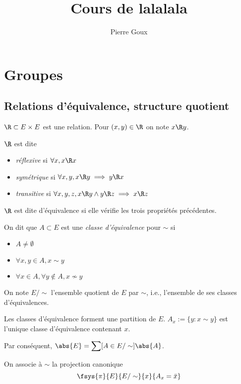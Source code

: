 \documentclass[a4paper,11pt,twocolumn]{article}
\title[Structures algébriques finies]{Cours de lalalala}
\author{Pierre Goux}
\begin{document}

\maketitle

\section{Groupes}

  \subsection{Relations d'équivalence, structure quotient}

     $\R\subset E\times E$ est une relation. Pour $(x,y)\in\R$ on note $x\R y$.

     $\R$ est dite
    \begin{itemize}
      \item \emph{réflexive} si $\forall x, x\R x$
      \item \emph{symétrique} si $\forall x,y, x\R y \implies y\R x$
      \item \emph{transitive} si $\forall x,y,z, x\R y \wedge y\R z \implies x\R z$
    \end{itemize}

    $\R$ est dite d'équivalence si elle vérifie les trois propriétés précédentes.

     On dit que $A\subset E$ est une \emph{classe d'équivalence} pour $\sim$ si
    \begin{itemize}
      \item $A\neq\emptyset$
      \item $\forall x,y\in A, x\sim y$
      \item $\forall x\in A, \forall y\notin A, x\nsim y$
    \end{itemize}

    On note $E/\sim$ l'ensemble quotient de $E$ par $\sim$, i.e., l'ensemble de ses classes d'équivalences.

     Les classes d'équivalence forment une partition de $E$. $A_x:=\{y:x\sim y\}$ est l'unique classe d'équivalence contenant $x$.

    Par conséquent, $\displaystyle\abs{E} = \sum[A\in E/\sim]{\abs{A}}$.

     On associe à $\sim$ la projection canonique
    \[\fsys{\pi}{E}{E/\sim}{x}{A_x = \bar{x}}\]
\end{document}
